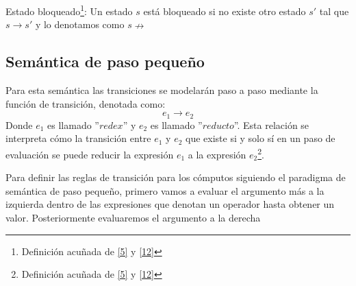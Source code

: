     \begin{definition}Estado bloqueado\footnote{Definición acuñada de \hyperlink{5}{[5]} y  \hyperlink{12}{[12]} }: Un estado $s$ está bloqueado si no existe otro estado $s'$ tal que $s \rightarrow s'$ y lo denotamos como $s \nrightarrow$
    \end{definition}


    \subsection{Semántica de paso pequeño}
        Para esta semántica las transiciones se modelarán paso a paso mediante la función de transición, denotada como: 
	$$e_1 \rightarrow e_2$$ 
	Donde $e_1$ es llamado ''$redex$'' y $e_2$ es llamado ''$reducto$''. Esta relación se interpreta cómo la transición entre $e_1$ y $e_2$ que existe si y solo sí en un paso de evaluación se puede reducir la expresión $e_1$ a la expresión $e_2$\footnote{Definición acuñada de \hyperlink{5}{[5]} y  \hyperlink{12}{[12]} }.

	Para definir las reglas de transición para los cómputos siguiendo el paradigma de semántica de paso pequeño, primero vamos a evaluar el argumento más a la izquierda dentro de las expresiones que denotan un operador hasta obtener un valor. Posteriormente evaluaremos el argumento a la derecha

